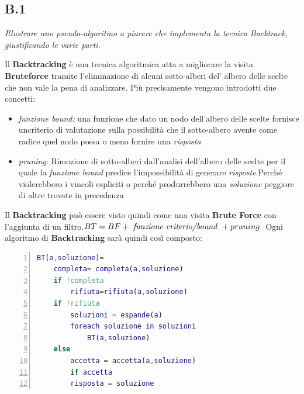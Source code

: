 \documentclass[a4paper]{article}
\begin{document}
\subsection{B.1}
\emph{Illustrare uno pseudo-algoritmo a piacere che implementa la tecnica Backtrack, giustificando le varie parti.}

Il \textbf{Backtracking} è una tecnica algoritmica atta a migliorare la visita \textbf{Bruteforce} tramite l'eliminazione di alcuni sotto-alberi del' albero delle scelte che non vale la pena di analizzare.
Più precisamente vengono introdotti due concetti:
\begin{itemize}
	\item \textit{funzione bound:} una funzione che dato un nodo dell'albero delle scelte fornisce uncriterio di valutazione sulla possibilità che il sotto-albero avente come radice quel nodo possa o meno fornire una \textit{risposta}
	\item \textit{pruning}: Rimozione di sotto-alberi dall'analisi dell'albero delle scelte per il quale la \textit{funzione bound} predice l'impossibilità di generare \textit{risposte}.Perché violerebbero i vincoli espliciti o perché produrrebbero una \textit{soluzione} peggiore di altre trovate in precedenza
\end{itemize}
Il \textbf{Backtracking} può essere visto quindi come una visita \textbf{Brute Force} con l'aggiunta di un filtro.$BT = BF + \text{ \textit{funzione criterio/bound} }+ pruning.$
Ogni algoritmo di \textbf{Backtracking} sarà quindi così composto:
\begin{lstlisting}[numbers=left,firstnumber=1,stepnumber=1, xleftmargin=15pt, language=Matlab ]
BT(a,soluzione)=
    completa= completa(a,soluzione)
    if !completa
        rifiuta=rifiuta(a,soluzione)
	if !rifiuta
	    soluzioni = espande(a)
	    foreach soluzione in soluzioni
	        BT(a,soluzione)
    else
    	accetta = accetta(a,soluzione)
        if accetta
	    risposta = soluzione
\end{lstlisting}
\end{document}
